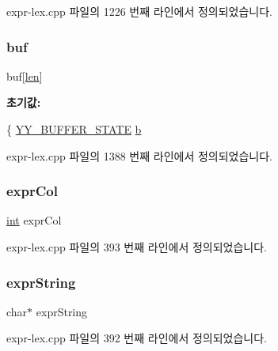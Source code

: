 expr-\/lex.\+cpp 파일의 1226 번째 라인에서 정의되었습니다.

\mbox{\label{expr-lex_8cpp_aaaf5379ca5750ed4ef26a247cca0103c}} 
\subsubsection{\texorpdfstring{buf}{buf}}
{\footnotesize\ttfamily buf\mbox{[}\mbox{\hyperlink{expr-lex_8cpp_afed088663f8704004425cdae2120b9b3}{len}}\mbox{]}}

{\bfseries 초기값\+:}
\begin{DoxyCode}
\{
        \mbox{\hyperlink{structyy__buffer__state}{YY\_BUFFER\_STATE}} \mbox{\hyperlink{expr-lex_8cpp_a91b64995742fd30063314f12340b4b5a}{b}}
\end{DoxyCode}


expr-\/lex.\+cpp 파일의 1388 번째 라인에서 정의되었습니다.

\mbox{\label{expr-lex_8cpp_a5aaef62994ad4e49e786f5228b548541}} 
\subsubsection{\texorpdfstring{expr\+Col}{exprCol}}
{\footnotesize\ttfamily \mbox{\hyperlink{_util_8cpp_a0ef32aa8672df19503a49fab2d0c8071}{int}} expr\+Col}



expr-\/lex.\+cpp 파일의 393 번째 라인에서 정의되었습니다.

\mbox{\label{expr-lex_8cpp_aa1f704d92ffa441305e3434381d676f7}} 
\subsubsection{\texorpdfstring{expr\+String}{exprString}}
{\footnotesize\ttfamily char$\ast$ expr\+String}



expr-\/lex.\+cpp 파일의 392 번째 라인에서 정의되었습니다.

\mbox{\label{expr-lex_8cpp_a702945180aa732857b380a007a7e2a21}} 
